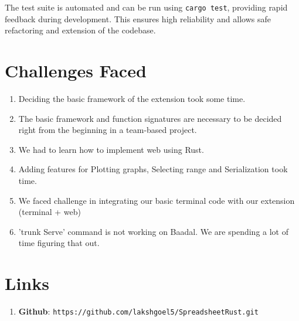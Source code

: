 \documentclass{article}
\begin{document}
\noindent
The test suite is automated and can be run using \texttt{cargo test}, providing rapid feedback during development. This ensures high reliability and allows safe refactoring and extension of the codebase.


\section{Challenges Faced}
\begin{enumerate}
    \item Deciding the basic framework of the extension took some time.
    \item The basic framework and function signatures are necessary to be decided right from the beginning in a team-based project.
    \item We had to learn how to implement web using Rust.
    \item Adding features for Plotting graphs, Selecting range and Serialization took time.
    \item We faced challenge in integrating our basic terminal code with our extension (terminal + web)
    \item 'trunk Serve' command is not working on Baadal. We are spending a lot of time figuring that out.
\end{enumerate}


\section{Links}
\begin{enumerate}
    \item \textbf{Github}: \texttt{https://github.com/lakshgoel5/SpreadsheetRust.git}
\end{enumerate}
\end{document}
